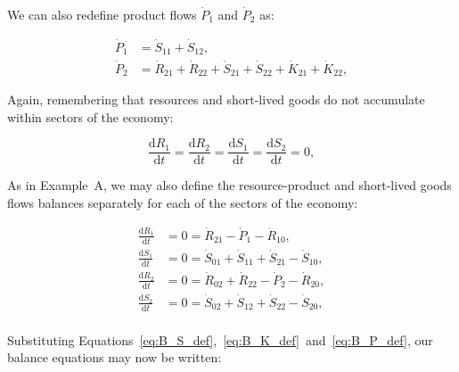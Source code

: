 



We can also redefine product flows
$\dot{P}_{1}$ and $\dot{P}_{2}$ as:

\begin{align}
\label{eq:B_P1_def}
	\dot{P}_{1}				&
	= \dot{S}_{11}
	+ \dot{S}_{12},			\\
\label{eq:B_P2_def}
	\dot{P}_{2}				&
	= \dot{R}_{21}
	+ \dot{R}_{22}
	+ \dot{S}_{21}
	+ \dot{S}_{22}
	+ \dot{K}_{21}	 
	+ \dot{K}_{22},
\end{align}


\noindent Again, remembering that resources and short-lived
goods do not accumulate within sectors of the economy:

\begin{equation}\label{eq:dR_and_dS_zero}
	\frac{\mathrm{d}R_{1}}{\mathrm{d}t}
	= \frac{\mathrm{d}R_{2}}{\mathrm{d}t} 
	= \frac{\mathrm{d}S_{1}}{\mathrm{d}t} 
	= \frac{\mathrm{d}S_{2}}{\mathrm{d}t} 
	= 0,
\end{equation}

As in Example~A,
we may also define the resource-product
and short-lived goods flows balances separately
for each of the sectors of the economy:

\begin{align}
\label{eq:B_dR1}
	\frac{\mathrm{d}R_{1}}{\mathrm{d}t} 	&
	= 0
	= \dot{R}_{21}
	- \dot{P}_{1}
	- \dot{R}_{10},							\\
\label{eq:B_dS1}
	\frac{\mathrm{d}S_{1}}{\mathrm{d}t} 	&
	= 0
	= \dot{S}_{01}
	+ \dot{S}_{11}
	+ \dot{S}_{21}
	- \dot{S}_{10},							\\
\label{eq:B_dR2}
	\frac{\mathrm{d}R_{2}}{\mathrm{d}t} 	&
	= 0
	= \dot{R}_{02}
	+ \dot{R}_{22}
	- \dot{P}_{2}
	- \dot{R}_{20},							\\
\label{eq:B_dS2}
	\frac{\mathrm{d}S_{2}}{\mathrm{d}t} 	&
	= 0
	= \dot{S}_{02}
	+ \dot{S}_{12}
	+ \dot{S}_{22}
	- \dot{S}_{20},							\\
\end{align}

Substituting
Equations~\ref{eq:B_S_def},~\ref{eq:B_K_def}~and~\ref{eq:B_P_def}, 
our balance equations may now be written:

